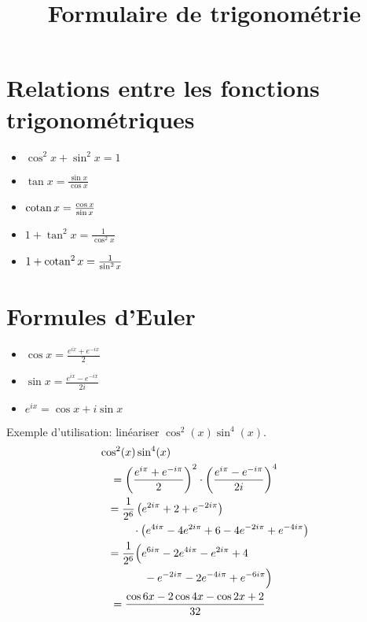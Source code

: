 \documentclass{yann}
\newcommand\me{e}
\newcommand\I{i}
\newcommand\Ei[1]{\me^{#1\I\pi}}
\begin{document}
\title{Formulaire de trigonométrie}
\maketitle

\section{Relations entre les fonctions trigonométriques}

\begin{itemize}
\item
$\cos^2 x + \sin^2 x = 1$
\item
$\tan x   = \frac{\sin x}{\cos x}$
\item
$\operatorname{cotan} x = \frac{\cos x}{\sin x}$
\item
$1 + \tan^2 x   = \frac{1}{\cos^2 x}$
\item
$1 + \operatorname{cotan}^2 x = \frac{1}{\sin^2 x}$
\end{itemize}

\section{Formules d'Euler}

\begin{itemize}
\item
$\cos x     = \frac{\me^{\I x} + \me^{-\I x}}{2}$
\item
$\sin x     = \frac{\me^{\I x} - \me^{-\I x}}{2\I}$
\item
$\me^{\I x} = \cos x + \I \sin x$
\end{itemize}

Exemple d'utilisation: linéariser $\cos^2 (x) \sin^4 (x)$.
\[ \begin{aligned}
  & \cos^2 (x) \sin^4 (x) \\
  & \quad = \Pafrac{\Ei{}+\Ei{-}}{2}^2\cdot\Pafrac{\Ei{}-\Ei{-}}{2\I}^4 \\
  & \begin{split}
    \quad ={} &\frac{1}{2^6} \Pa{\Ei{2} + 2 +\Ei{-2} } \\
    &\quad \cdot \Pa{\Ei{4} - 4\Ei{2} + 6 - 4\Ei{-2} +\Ei{-4} } \end{split} \\
  & \begin{split}
    \quad ={} & \frac{1}{2^6} \Bigl( \Ei{6} - 2\Ei{4} -\Ei{2} + 4 \\
    &\qquad -\Ei{-2} - 2\Ei{-4} +\Ei{-6} \Bigr) \end{split} \\
  & \quad = \frac{\cos 6x - 2 \cos 4x - \cos 2x + 2}{32}
\end{aligned} \]
\end{document}
